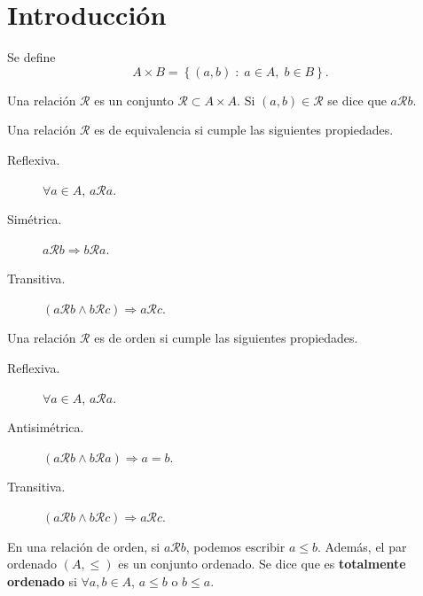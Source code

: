 \section{Introducción}
\begin{fdefinition}
\normalfont Se define
\[A \times B = \left\{ \left(a,b\right) \; : \; a \in A, \; b \in B\right\}  .\]
\end{fdefinition}
Una relación $\displaystyle \mathcal{R} $ es un conjunto $\displaystyle \mathcal{R}\subset A\times A $. Si $\displaystyle \left(a,b\right) \in \mathcal{R} $ se dice que $\displaystyle a \mathcal{R}b $.
\begin{fdefinition}
\normalfont Una relación $\displaystyle \mathcal{R} $ es de equivalencia si cumple las siguientes propiedades.
\begin{description}
\item[Reflexiva.] $\displaystyle \forall a \in A $, $\displaystyle a \mathcal{R}a $. 
\item[Simétrica.] $\displaystyle a \mathcal{R}b \Rightarrow b \mathcal{R} a $.
\item[Transitiva.] $\displaystyle \left(a \mathcal{R} b \land b \mathcal{R} c\right) \Rightarrow a \mathcal{R} c $.
\end{description}
\end{fdefinition}

\begin{fdefinition}
\normalfont Una relación $\displaystyle \mathcal{R} $ es de orden si cumple las siguientes propiedades.
\begin{description}
\item[Reflexiva.] $\displaystyle \forall a \in A $, $\displaystyle a \mathcal{R}a $. 
\item[Antisimétrica.] $\displaystyle \left(a \mathcal{R}b \land b \mathcal{R} a\right) \Rightarrow a = b $.
\item[Transitiva.] $\displaystyle \left(a \mathcal{R} b \land b \mathcal{R} c\right) \Rightarrow a \mathcal{R} c $.
\end{description}
\end{fdefinition}
\begin{notation}
\normalfont En una relación de orden, si $\displaystyle a \mathcal{R} b $, podemos escribir $\displaystyle a \leq b $. Además, el par ordenado $\displaystyle \left(A, \leq \right) $ es un conjunto ordenado. Se dice que es \textbf{totalmente ordenado} si $\displaystyle \forall a, b \in A $, $\displaystyle a \leq b $ o $\displaystyle b \leq a $.
\end{notation}

